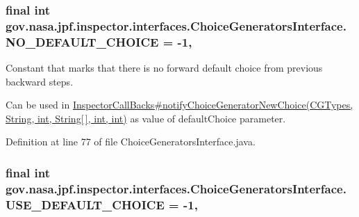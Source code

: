 \subsubsection[{\texorpdfstring{N\+O\+\_\+\+D\+E\+F\+A\+U\+L\+T\+\_\+\+C\+H\+O\+I\+CE}{NO_DEFAULT_CHOICE}}]{\setlength{\rightskip}{0pt plus 5cm}final int gov.\+nasa.\+jpf.\+inspector.\+interfaces.\+Choice\+Generators\+Interface.\+N\+O\+\_\+\+D\+E\+F\+A\+U\+L\+T\+\_\+\+C\+H\+O\+I\+CE = -\/1\hspace{0.3cm}{\ttfamily [static]}, {\ttfamily [inherited]}}\hypertarget{interfacegov_1_1nasa_1_1jpf_1_1inspector_1_1interfaces_1_1_choice_generators_interface_a96ec402a57d2b3547337e677e23075cd}{}\label{interfacegov_1_1nasa_1_1jpf_1_1inspector_1_1interfaces_1_1_choice_generators_interface_a96ec402a57d2b3547337e677e23075cd}


Constant that marks that there is no forward default choice from previous backward steps. 

Can be used in \hyperlink{}{Inspector\+Call\+Backs\#notify\+Choice\+Generator\+New\+Choice(\+C\+G\+Types, String, int, String\mbox{[}$\,$\mbox{]}, int, int)} as value of default\+Choice parameter. 

Definition at line 77 of file Choice\+Generators\+Interface.\+java.

\subsubsection[{\texorpdfstring{U\+S\+E\+\_\+\+D\+E\+F\+A\+U\+L\+T\+\_\+\+C\+H\+O\+I\+CE}{USE_DEFAULT_CHOICE}}]{\setlength{\rightskip}{0pt plus 5cm}final int gov.\+nasa.\+jpf.\+inspector.\+interfaces.\+Choice\+Generators\+Interface.\+U\+S\+E\+\_\+\+D\+E\+F\+A\+U\+L\+T\+\_\+\+C\+H\+O\+I\+CE = -\/1\hspace{0.3cm}{\ttfamily [static]}, {\ttfamily [inherited]}}\hypertarget{interfacegov_1_1nasa_1_1jpf_1_1inspector_1_1interfaces_1_1_choice_generators_interface_ac57a2bb0eb101be2c2b27bd19cb81ea7}{}\label{interfacegov_1_1nasa_1_1jpf_1_1inspector_1_1interfaces_1_1_choice_generators_interface_ac57a2bb0eb101be2c2b27bd19cb81ea7}


